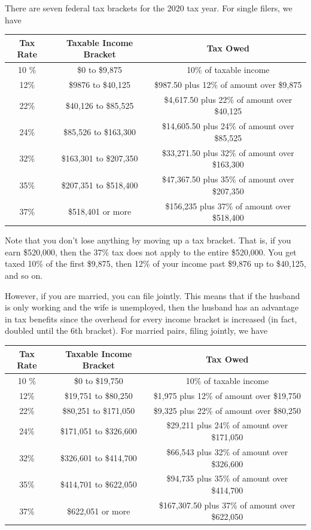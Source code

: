 \documentclass{article}
\begin{document}
    \begin{example}
      There are seven federal tax brackets for the 2020 tax year. For single filers, we have
      \begin{center}
      \begin{tabular}{c|c|c}
        Tax Rate & Taxable Income Bracket & Tax Owed \\
        \hline
        10 \% & \$0 to \$9,875 & 10\% of taxable income \\
        12\% & \$9876 to \$40,125 & \$987.50 plus 12\% of amount over \$9,875\\
        22\% & \$40,126 to \$85,525 & \$4,617.50 plus 22\% of amount over \$40,125\\
        24\% & \$85,526 to \$163,300 & \$14,605.50 plus 24\% of amount over \$85,525\\
        32\% & \$163,301 to \$207,350 & \$33,271.50 plus 32\% of amount over \$163,300\\
        35\% & \$207,351 to \$518,400 & \$47,367.50 plus 35\% of amount over \$207,350\\
        37\% & \$518,401 or more & \$156,235 plus 37\% of amount over \$518,400
      \end{tabular}
      \end{center}
      Note that you don't lose anything by moving up a tax bracket. That is, if you earn \$520,000, then the 37\% tax does not apply to the entire \$520,000. You get taxed 10\% of the first \$9,875, then 12\% of your income past \$9,876 up to \$40,125, and so on. 

      However, if you are married, you can file jointly. This means that if the husband is only working and the wife is unemployed, then the husband has an advantage in tax benefits since the overhead for every income bracket is increased (in fact, doubled until the 6th bracket). For married pairs, filing jointly, we have 
      \begin{center}
      \begin{tabular}{c|c|c}
        Tax Rate & Taxable Income Bracket & Tax Owed \\
        \hline
        10 \% & \$0 to \$19,750 & 10\% of taxable income \\
        12\% & \$19,751 to \$80,250 & \$1,975 plus 12\% of amount over \$19,750\\
        22\% & \$80,251 to \$171,050 & \$9,325 plus 22\% of amount over \$80,250\\
        24\% & \$171,051 to \$326,600 & \$29,211 plus 24\% of amount over \$171,050\\
        32\% & \$326,601 to \$414,700 & \$66,543 plus 32\% of amount over \$326,600\\
        35\% & \$414,701 to \$622,050 & \$94,735 plus 35\% of amount over \$414,700\\
        37\% & \$622,051 or more & \$167,307.50 plus 37\% of amount over \$622,050
      \end{tabular}
      \end{center}
    \end{example}
\end{document}
